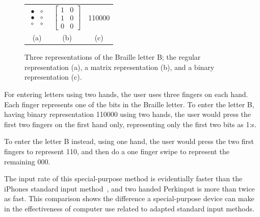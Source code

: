 \begin{figure}[h!]
\centering

\begin{tabular}{c c c}

$
\begin{array}{cc}
\bullet & \circ \\
\bullet & \circ \\
\circ & \circ \end{array}
$

&

$
\left[ \begin{array}{cc}
1 & 0 \\
1 & 0 \\
0 & 0 \end{array} \right]
$ 

&

110000 \\

(a) & (b) & (c)

\end{tabular}


\caption{Three representations of the Braille letter B; the regular representation (a), a matrix representation (b), and a binary representation (c).}
\label{fig:brailleexample}


\end{figure}


For entering letters using two hands, the user uses three fingers on each hand. Each finger represents one of the bits in the Braille letter. To enter the letter B, having binary representation 110000 using two hands, the user would press the first two fingers on the first hand only, representing only the first two bits as 1:s.

To enter the letter B instead, using one hand, the user would press the two first fingers to represent 110, and then do a one finger swipe to represent the remaining 000.

The input rate of this special-purpose method is evidentially faster than the iPhones standard input method~\cite{azenkot}, and two handed Perkinput is more than twice as fast. This comparison shows the difference a special-purpose device can make in the effectiveness of computer use related to adapted standard input methods. 

